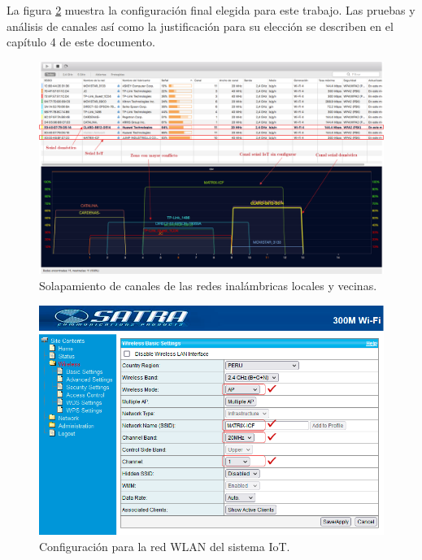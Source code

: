 La figura \ref{fig:configuracionancho} muestra la configuración final elegida para este trabajo. Las pruebas y análisis de canales así como la justificación para su elección se describen en el capítulo 4 de este documento.

\begin{landscape} %
\begin{figure}[htpb]
\centering 
\includegraphics[width=1.5\textwidth]{./Figures/wifi/01-doc.png}
\caption{Solapamiento de canales de las redes inalámbricas locales y vecinas.}
\label{fig:solapamiento}
\end{figure}
\end{landscape} %
\vspace{0.5cm}
\begin{figure}[htpb]
\centering 
\includegraphics[width=1.0\textwidth]{./Figures/configuracionancho.png}
\caption{Configuración para la red WLAN del sistema IoT.}
\label{fig:configuracionancho}
\end{figure}

